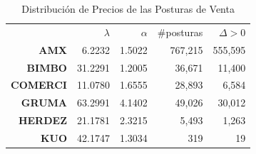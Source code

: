 \documentclass[11pt]{article}
\numberwithin{equation}{section} %
\begin{document}
\begin{table}[htbp]
\centering
\caption{Distribución de Precios de las Posturas de Venta}
\begin{tabular}{r|r|r|r|r|}
\cline{2-5}
& $\lambda$ & $\alpha$ & \#posturas & $\Delta>0$ \\
\cline{2-5}
\textbf{AMX}   & 6.2232 & 1.5022 & 767,215 & 555,595 \\
\textbf{BIMBO} & 31.2291 & 1.2005 & 36,671 & 11,400 \\
\textbf{COMERCI}   & 11.0780 & 1.6555 & 28,893 & 6,584 \\
\textbf{GRUMA} & 63.2991 & 4.1402 & 49,026 & 30,012 \\
\textbf{HERDEZ} & 21.1781 & 2.3215 & 5,493 & 1,263 \\
\textbf{KUO}   & 42.1747 & 1.3034 & 319   & 19 \\
\cline{2-5}
\end{tabular}%
\label{tab:powerventa}%
\end{table}%
\end{document}
